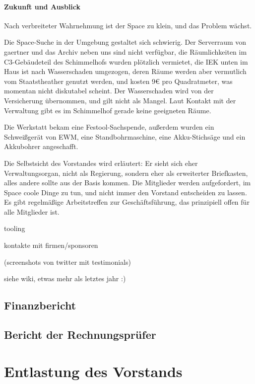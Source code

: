 \documentclass{s0minutes}
\begin{document}
\paragraph{Zukunft und Ausblick}

Nach verbreiteter Wahrnehmung ist der Space zu klein, und das Problem wächst.

Die Space-Suche in der Umgebung gestaltet sich schwierig. Der Serverraum von gaertner und das Archiv neben uns sind nicht verfügbar, die Räumlichkeiten im C3-Gebäudeteil des Schimmelhofs wurden plötzlich vermietet, die IEK unten im Haus ist nach Wasserschaden umgezogen, deren Räume werden aber vermutlich vom Staatstheather genutzt werden, und kosten 9€ pro Quadratmeter, was momentan nicht diskutabel scheint. Der Wasserschaden wird von der Versicherung übernommen, und gilt nicht als Mangel. Laut Kontakt mit der Verwaltung gibt es im Schimmelhof gerade keine geeigneten Räume.

Die Werkstatt bekam eine Festool-Sachspende, außerdem wurden ein Schweißgerät von EWM, eine Standbohrmaschine, eine Akku-Stichsäge und ein Akkubohrer angeschafft.

Die Selbstsicht des Vorstandes wird erläutert: Er sieht sich eher Verwaltungsorgan, nicht als Regierung, sondern eher als erweiterter Briefkasten, alles andere sollte aus der Basis kommen.
Die Mitglieder werden aufgefordert, im Space coole Dinge zu tun, und nicht immer den Vorstand entscheiden zu lassen. Es gibt regelmäßige Arbeitstreffen zur Geschäftsführung, das prinzipiell offen für alle Mitglieder ist.

tooling

kontakte mit firmen/sponsoren

(screenshots von twitter mit testimonials)


siehe wiki, etwas mehr als letztes jahr :)

\subsection{Finanzbericht}

\subsection{Bericht der Rechnungsprüfer}

\section{Entlastung des Vorstands}
\end{document}
